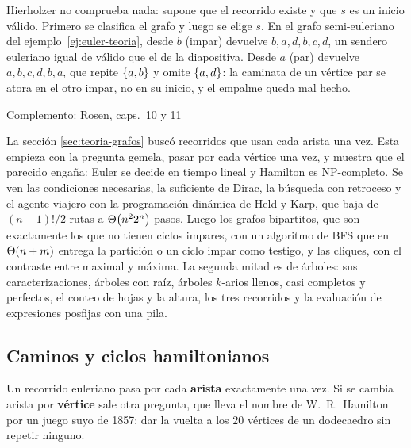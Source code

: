 \documentclass[11pt,letterpaper]{article}
\begin{document}
\begin{ojo}
  Hierholzer no comprueba nada: supone que el recorrido existe y que
  $s$ es un inicio válido. Primero se clasifica el grafo y luego se
  elige $s$. En el grafo semi-euleriano
  del ejemplo~\ref{ej:euler-teoria}, desde $b$ (impar) devuelve
  $b, a, d, b, c, d$, un sendero euleriano igual de válido que el de
  la diapositiva. Desde $a$ (par) devuelve $a, b, c, d, b, a$, que
  repite $\left\{ a, b \right\}$ y omite $\left\{ a, d \right\}$: la caminata de un vértice
  par se atora en el otro impar, no en su inicio, y el empalme queda
  mal hecho.
\end{ojo}

\newpage


%
      {Complemento: Rosen, caps.\ 10 y 11}
\label{sec:hamilton-arboles}

\begin{quick_sum}
  La sección \ref{sec:teoria-grafos} buscó recorridos que usan cada
  arista una vez. Esta empieza con la pregunta gemela, pasar por cada
  vértice una vez, y muestra que el parecido engaña: Euler se decide
  en tiempo lineal y Hamilton es NP-completo. Se ven las condiciones
  necesarias, la suficiente de Dirac, la búsqueda con retroceso y el
  agente viajero con la programación dinámica de Held y Karp, que
  baja de $(n-1)!/2$ rutas a $\Theta\!\left(n^2 2^n\right)$ pasos. Luego los grafos
  bipartitos, que son exactamente los que no tienen ciclos impares,
  con un algoritmo de BFS que en $\Theta\!\left(n + m\right)$ entrega la partición o
  un ciclo impar como testigo, y las cliques, con el contraste entre
  maximal y máxima. La segunda mitad es de árboles: sus
  caracterizaciones, árboles con raíz, árboles $k$-arios llenos, casi
  completos y perfectos, el conteo de hojas y la altura, los tres
  recorridos y la evaluación de expresiones posfijas con una pila.
\end{quick_sum}

\subsection*{Caminos y ciclos hamiltonianos}

Un recorrido euleriano pasa por cada \textbf{arista} exactamente una
vez. Si se cambia arista por \textbf{vértice} sale otra pregunta, que
lleva el nombre de W.\ R.\ Hamilton por un juego suyo de 1857: dar la
vuelta a los $20$ vértices de un dodecaedro sin repetir ninguno.
\end{document}
